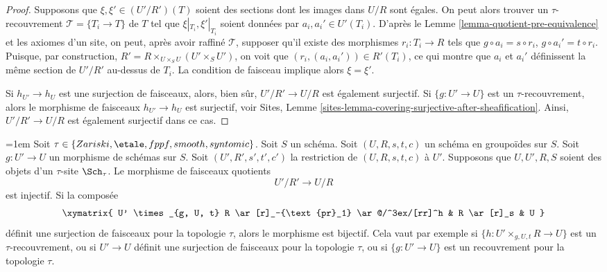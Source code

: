 \begin{proof}
Supposons que $\xi, \xi' \in (U'/R')(T)$ soient des sections dont les
images dans $U/R$ sont égales.
On peut alors trouver un $\tau$-recouvrement $\mathcal{T} = \{T_i \to T\}$ de $T$
tel que $\xi|_{T_i}, \xi'|_{T_i}$ soient données par $a_i, a_i' \in U'(T_i)$. D'après le
Lemme \ref{lemma-quotient-pre-equivalence}
et les axiomes d'un site, on peut, après avoir raffiné
$\mathcal{T}$, supposer qu'il existe des morphismes $r_i : T_i \to R$
tels que $g \circ a_i = s \circ r_i$, $g \circ a_i' = t \circ r_i$.
Puisque, par construction,
$R' = R \times_{U \times_S U} (U' \times_S U')$,
on voit que $(r_i, (a_i, a_i')) \in R'(T_i)$, ce qui
montre que $a_i$ et $a_i'$ définissent la même section
de $U'/R'$ au-dessus de $T_i$. La condition de faisceau implique alors
$\xi = \xi'$.

\medskip\noindent
Si $h_{U'} \to h_U$ est une surjection
de faisceaux, alors, bien sûr, $U'/R' \to U/R$ est également surjectif.
Si $\{g : U' \to U\}$ est un $\tau$-recouvrement, alors
le morphisme de faisceaux $h_{U'} \to h_U$ est surjectif, voir
Sites, Lemme \ref{sites-lemma-covering-surjective-after-sheafification}.
Ainsi, $U'/R' \to U/R$ est également surjectif dans ce cas.
\end{proof}

\begin{lemma}\emergencystretch=1em
\label{lemma-quotient-groupoid-restrict}
Soit $\tau \in\allowbreak \{Zariski,\allowbreak \etale,\allowbreak fppf,\allowbreak smooth,\allowbreak syntomic\}$.
Soit $S$ un schéma.
Soit $(U, R, s, t, c)$ un schéma en groupoïdes sur $S$.
Soit $g : U' \to U$ un morphisme de schémas sur $S$.
Soit $(U', R', s', t', c')$ la restriction de $(U, R, s, t, c)$ à $U'$.
Supposons que $U, U', R, S$ soient des objets d'un $\tau$-site $\Sch_\tau$.
Le morphisme de faisceaux quotients
$$
U'/R' \longrightarrow U/R
$$
est injectif. Si la composée
$$
\xymatrix{
U' \times_{g, U, t} R \ar[r]_-{\text{pr}_1} \ar@/^3ex/[rr]^h
& R \ar[r]_s & U
}
$$
définit une surjection de faisceaux pour la topologie $\tau$, alors
le morphisme est bijectif. Cela vaut par exemple si
$\{h : U' \times_{g, U, t} R \to U\}$ est un $\tau$-recouvrement, ou
si $U' \to U$ définit une surjection de faisceaux pour la topologie $\tau$, ou si
$\{g : U' \to U\}$ est un recouvrement pour la topologie $\tau$.
\end{lemma}

